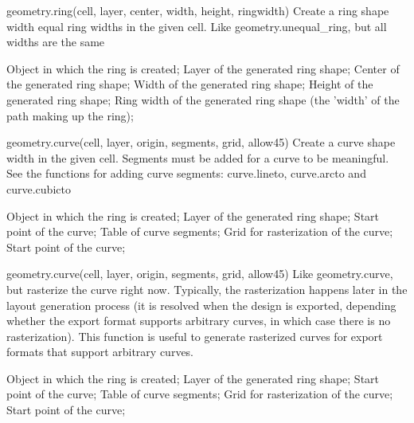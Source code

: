 \begin{APIfunc}{geometry.ring(cell, layer, center, width, height, ringwidth)}
    Create a ring shape width equal ring widths in the given cell. Like geometry.unequal\_ring, but all widths are the same
    \begin{APIparameters}
            Object in which the ring is created;
            Layer of the generated ring shape;
            Center of the generated ring shape;
            Width of the generated ring shape;
            Height of the generated ring shape;
            Ring width of the generated ring shape (the 'width' of the path making up the ring);
    \end{APIparameters}
\end{APIfunc}
\begin{APIfunc}{geometry.curve(cell, layer, origin, segments, grid, allow45)}
    Create a curve shape width in the given cell. Segments must be added for a curve to be meaningful. See the functions for adding curve segments: curve.lineto, curve.arcto and curve.cubicto
    \begin{APIparameters}
            Object in which the ring is created;
            Layer of the generated ring shape;
            Start point of the curve;
            Table of curve segments;
            Grid for rasterization of the curve;
            Start point of the curve;
    \end{APIparameters}
\end{APIfunc}
\begin{APIfunc}{geometry.curve(cell, layer, origin, segments, grid, allow45)}
    Like geometry.curve, but rasterize the curve right now. Typically, the rasterization happens later in the layout generation process (it is resolved when the design is exported, depending whether the export format supports arbitrary curves, in which case there is no rasterization). This function is useful to generate rasterized curves for export formats that support arbitrary curves.
    \begin{APIparameters}
            Object in which the ring is created;
            Layer of the generated ring shape;
            Start point of the curve;
            Table of curve segments;
            Grid for rasterization of the curve;
            Start point of the curve;
    \end{APIparameters}
\end{APIfunc}
